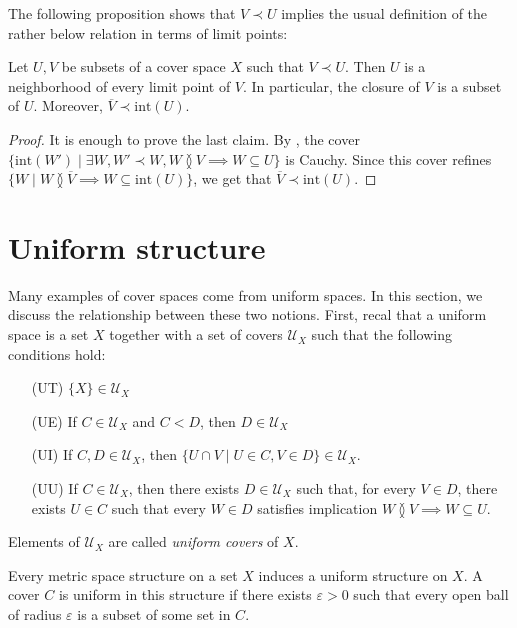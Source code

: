 \documentclass[reqno]{amsart}
\theoremstyle{definition}
\theoremstyle{remark}
\numberwithin{figure}{section}
\newcommand{\overlap}[2]{#1 \between #2}
\newcommand{\refines}{<}
\newcommand{\rb}{\prec}
\begin{document}
The following proposition shows that $V \rb U$ implies the usual definition of the rather below relation in terms of limit points:

\begin{prop}[rb-closure]
Let $U,V$ be subsets of a cover space $X$ such that $V \rb U$.
Then $U$ is a neighborhood of every limit point of $V$.
In particular, the closure of $V$ is a subset of $U$.
Moreover, $\overline{V} \rb \mathrm{int}(U)$.
\end{prop}
\begin{proof}
It is enough to prove the last claim.
By , the cover $\{ \mathrm{int}(W') \mid \exists W, W' \rb W, \overlap{W}{V} \implies W \subseteq U \}$ is Cauchy.
Since this cover refines $\{ W \mid \overlap{W}{\overline{V}} \implies W \subseteq \mathrm{int}(U) \}$, we get that $\overline{V} \rb \mathrm{int}(U)$.
\end{proof}

\section{Uniform structure}

Many examples of cover spaces come from uniform spaces.
In this section, we discuss the relationship between these two notions.
First, recal that a uniform space is a set $X$ together with a set of covers $\mathcal{U}_X$ such that the following conditions hold:
\begin{itemize}
\item[(UT)] $\{ X \} \in \mathcal{U}_X$
\item[(UE)] If $C \in \mathcal{U}_X$ and $C \refines D$, then $D \in \mathcal{U}_X$
\item[(UI)] If $C,D \in \mathcal{U}_X$, then $\{ U \cap V \mid U \in C, V \in D \} \in \mathcal{U}_X$.
\item[(UU)] If $C \in \mathcal{U}_X$, then there exists $D \in \mathcal{U}_X$ such that, for every $V \in D$,
there exists $U \in C$ such that every $W \in D$ satisfies implication $\overlap{W}{V} \implies W \subseteq U$.
\end{itemize}
Elements of $\mathcal{U}_X$ are called \emph{uniform covers} of $X$.

\begin{example}
Every metric space structure on a set $X$ induces a uniform structure on $X$.
A cover $C$ is uniform in this structure if there exists $\varepsilon > 0$ such that every open ball of radius $\varepsilon$ is a subset of some set in $C$.
\end{example}
\end{document}
